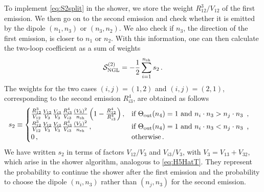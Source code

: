 \documentclass[11pt,a4paper]{article}
\begin{document}
To implement \eqref{eq:S2split} in the  shower, we store the weight  $R_{12}^{3}/V_{12}$ of the first emission. We then go on to the second emission and check whether it is emitted by the dipole $(n_1,n_3)$ or $(n_3,n_2)$. We also check if $n_3$, the direction of the first emission, is closer to $n_1$ or $n_2$. With this information, one can then  calculate the two-loop coefficient as a sum of weights 
\begin{equation}
\mathcal{S}_{\rm NGL} ^{(2)}=-\frac{1}{2}\sum_{i=1}^{n_{\rm{sh}}} s_2\,.
\end{equation}
The weights for the two cases $(i,j)=(1,2)$ and $(i,j)=(2,1)$, corresponding to the second emission $R_{i3}^{4}$, are obtained as follows
\begin{align}
s_2&\equiv \begin{cases}
\frac{R_{12}^{3}}{V_{12}}\frac{V_{12}}{V_3}\frac{V_{i3}}{V_3}\frac{R_{i3}^{4}}{V_{i3}}\frac{(V_3)^2}{n_{\rm{sh}}}\left(1-\frac{R_{12}^{4}}{R_{i3}^{4}}\right) ,& \text{if $\Theta_{\rm out}(n_4)=1$ and $n_i\cdot n_3>n_j\cdot n_3$\, ,}\\
\frac{R_{12}^{3}}{V_{12}}\frac{V_{12}}{V_3}\frac{V_{i3}}{V_3}\frac{R_{i3}^{4}}{V_{i3}}\frac{(V_3)^2}{n_{\rm{sh}}}\, ,& \text{if $\Theta_{\rm out}(n_4)=1$ and $n_i\cdot n_3<n_j\cdot n_3$\, ,}\\
0\,,              & \text{otherwise}\, .
\end{cases}
\end{align}
We have written $s_2$ in terms of factors ${V_{12}}/V_3$ and ${V_{i3}}/V_3$, with $V_3=V_{13}+V_{32}$, which arise in the shower algorithm, analogous to \eqref{eq:H5HatT}. They represent the probability to continue the shower after the first emission and the probability to choose the dipole $(n_i,n_3)$ rather than $(n_j,n_3)$ for the second emission.
\end{document}
